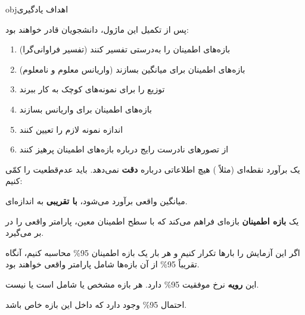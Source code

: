 \begin{PSbox}[unbreakable]{obj}{اهداف یادگیری}

پس از تکمیل این ماژول، دانشجویان قادر خواهند بود:

\begin{enumerate}
\def\labelenumi{\arabic{enumi}.}
\tightlist
\item
  بازه‌های اطمینان را به‌درستی تفسیر کنند (تفسیر فراوانی‌گرا)
\item
  بازه‌های اطمینان برای میانگین بسازند (واریانس معلوم و نامعلوم)
\item
  توزیع  را برای نمونه‌های کوچک به کار ببرند
\item
  بازه‌های اطمینان برای واریانس بسازند
\item
  اندازه نمونه لازم را تعیین کنند
\item
  از تصورهای نادرست رایج درباره بازه‌های اطمینان پرهیز کنند
\end{enumerate}

\end{PSbox}


یک برآورد نقطه‌ای (مثلاً ) هیچ اطلاعاتی درباره \textbf{دقت} نمی‌دهد. باید عدم‌قطعیت را کمّی کنیم:

میانگین واقعی  برآورد می‌شود، \textbf{با تقریبی} به اندازه‌ای.

یک \textbf{بازه اطمینان} بازه‌ای فراهم می‌کند که با سطح اطمینان معین، پارامتر واقعی را در بر می‌گیرد.



\begin{PSquote}

اگر این آزمایش را بارها تکرار کنیم و هر بار یک بازه اطمینان 95\% محاسبه کنیم، آنگاه تقریباً 95\% از آن بازه‌ها شامل پارامتر واقعی \lr{\ensuremath{\mu}} خواهند بود.

\end{PSquote}

این \textbf{رویه} نرخ موفقیت 95\% دارد. هر بازه مشخص یا شامل \lr{\ensuremath{\mu}} است یا نیست.


\begin{PSquote}

{احتمال 95\% وجود دارد که \lr{\ensuremath{\mu}} داخل این بازه خاص \PSnum{[2.1,} \PSnum{4.8]} باشد.}

\end{PSquote}

